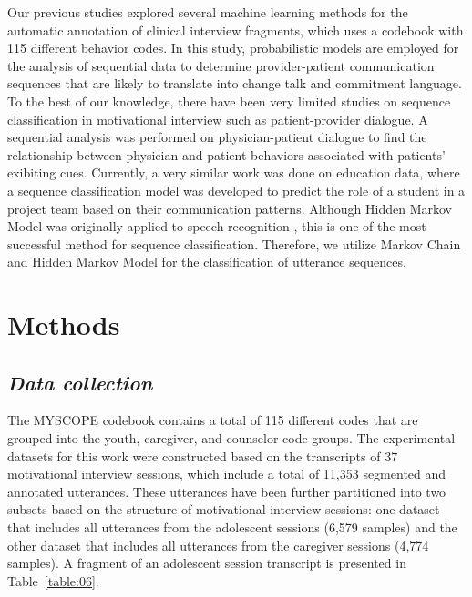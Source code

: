\documentclass{amia}
\begin{document}
Our previous studies \cite{kotov2015interpretable, hasan2016study} explored several machine learning methods for the automatic annotation of clinical interview fragments, which uses a codebook \cite{carcone2013provider} with 115 different behavior codes. In this study, probabilistic models are employed for the analysis of sequential data to determine provider-patient communication sequences that are likely to translate into change talk and commitment language. To the best of our knowledge, there have been very limited studies on sequence classification in motivational interview such as patient-provider dialogue. A sequential analysis \cite{eide2004physician} was performed on physician-patient dialogue to find the relationship between physician and patient behaviors associated with patients' exibiting cues. Currently, a very similar work \cite{jaber2016multi} was done on education data, where a sequence classification model was developed to predict the role of a student in a project team based on their communication patterns. Although Hidden Markov Model was originally applied to speech recognition \cite{rabiner1989tutorial}, this is one of the most successful method \cite{mutsam2016maximum, eickeler1998hidden, won2004training, chai2001folk} for sequence classification. Therefore, we utilize Markov Chain and Hidden Markov Model for the classification of utterance sequences.   

\section*{Methods}
\subsection*{\textit{Data collection}}
The MYSCOPE \cite{} codebook contains a total of 115 different codes that are grouped into the youth, caregiver, and counselor code groups. The experimental datasets for this work were constructed based on the transcripts of 37 motivational interview sessions, which
include a total of 11,353 segmented and annotated utterances. These utterances have been further partitioned into two subsets based on the structure of motivational interview
sessions: one dataset that includes all utterances from the adolescent sessions (6,579 samples) and the other dataset that includes all utterances from the caregiver sessions
(4,774 samples). A fragment of an adolescent session transcript is presented in Table~\ref{table:06}. \\
\end{document}
